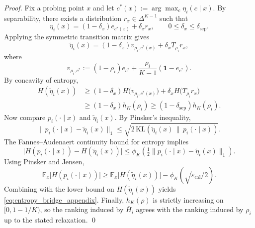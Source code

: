 \begin{proof}
Fix a probing point $x$ and let $c^*(x):=\arg\max_c \eta_i(c\mid x)$. By separability, there exists a distribution $r_x\in\Delta^{K-1}$ such that
\begin{equation}
\eta_i(x)
=
(1-\delta_x)e_{c^*(x)} + \delta_x r_x,
\qquad 0\le \delta_x \le \delta_{\mathrm{sep}}.
\end{equation}
Applying the symmetric transition matrix gives
\begin{equation}
\tilde\eta_i(x)
=
(1-\delta_x)v_{\rho_i,c^*(x)} + \delta_x T_{\rho_i}r_x,
\end{equation}
where
\begin{equation}
v_{\rho_i,c^*}
:=
(1-\rho_i)e_{c^*}
+ \frac{\rho_i}{K-1}(\mathbf{1}-e_{c^*}).
\end{equation}
By concavity of entropy,
\begin{align}
H(\tilde\eta_i(x))
&\ge
(1-\delta_x)H\big(v_{\rho_i,c^*(x)}\big)
+\delta_x H\big(T_{\rho_i}r_x\big) \\
&\ge
(1-\delta_x)h_K(\rho_i)
\ge
(1-\delta_{\mathrm{sep}})h_K(\rho_i).
\end{align}
Now compare $p_i(\cdot\mid x)$ and $\tilde\eta_i(x)$. By Pinsker's inequality,
\begin{equation}
\|p_i(\cdot\mid x)-\tilde\eta_i(x)\|_1
\le
\sqrt{2\,\mathrm{KL}(\tilde\eta_i(x)\,\|\,p_i(\cdot\mid x))}.
\end{equation}
The Fannes--Audenaert continuity bound for entropy implies~\cite{audenaert2007sharp}
\begin{equation}
\big|H(p_i(\cdot\mid x))-H(\tilde\eta_i(x))\big|
\le
\phi_K\!\left(\tfrac{1}{2}\|p_i(\cdot\mid x)-\tilde\eta_i(x)\|_1\right).
\end{equation}
Using Pinsker and Jensen,
\begin{equation}
\mathbb{E}_{x}\big[H(p_i(\cdot\mid x))\big]
\ge
\mathbb{E}_{x}\big[H(\tilde\eta_i(x))\big]
-
\phi_K\!\left(\sqrt{\varepsilon_{\mathrm{cal}}/2}\right).
\end{equation}
Combining with the lower bound on $H(\tilde\eta_i(x))$ yields \eqref{eq:entropy_bridge_appendix}. Finally, $h_K(\rho)$ is strictly increasing on $[0,1-1/K)$, so the ranking induced by $\bar H_i$ agrees with the ranking induced by $\rho_i$ up to the stated relaxation. \qed
\end{proof}

